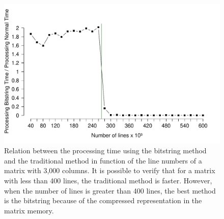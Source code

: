 \documentclass[10pt]{article}
\begin{document}
\begin{figure}[h]
  \centering
  \includegraphics[scale=0.6,clip]{fig44}
  \caption{Relation between the processing time using the bitstring method and 
the traditional method in function 
  of the line numbers of a matrix with 3,000 columns. It is possible to verify 
that for a matrix with less than 400 
  lines, the traditional method is faster. However, when the number of lines is 
greater  than 400 lines, the best 
  method is the bitstring because of the compressed representation in the matrix 
memory.}
  \label{fig44}
\end{figure}




\newpage

\clearpage



\end{document}
